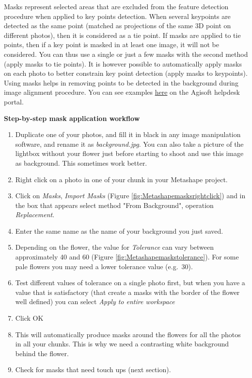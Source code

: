 \documentclass[
]{book}
\begin{document}
Masks represent selected areas that are excluded from the feature
detection procedure when applied to key points detection. When several
keypoints are detected as the same point (matched as projections of the
same 3D point on different photos), then it is considered as a tie
point. If masks are applied to tie points, then if a key point is masked
in at least one image, it will not be considered. You can thus use a
single or just a few masks with the second method (apply masks to tie
points). It is however possible to automatically apply masks on each
photo to better constrain key point detection (apply masks to
keypoints). Using masks helps in removing points to be detected in the
background during image alignment procedure. You can see examples
\href{https://agisoft.freshdesk.com/support/solutions/articles/31000158967-aligning-turntable-photos-with-background-suppression-from-single-mask-in-agisoft-metashape}{here}
on the Agisoft helpdesk portal.

\textbf{Step-by-step mask application workflow}

\begin{enumerate}
\def\labelenumi{\arabic{enumi}.}
\item
  Duplicate one of your photos, and fill it in black in any image
  manipulation software, and rename it as \emph{background.jpg}. You can
  also take a picture of the lightbox without your flower just before
  starting to shoot and use this image as background. This sometimes
  work better.
\item
  Right click on a photo in one of your chunk in your Metashape
  project.
\item
  Click on \emph{Masks}, \emph{Import Masks} (Figure \ref{fig:Metashapemasksrightclick}) and in the box that appears select method "From Background", operation \emph{Replacement}.
\item
  Enter the same name as the name of your background you just saved.
\item
  Depending on the flower, the value for \emph{Tolerance} can vary between
  approximately 40 and 60 (Figure \ref{fig:Metashapemaskstolerance}). For some pale flowers you may need a lower tolerance value (e.g.~30).
\item
  Test different values of tolerance on a single photo first, but when
  you have a value that is satisfactory (that create a masks with the
  border of the flower well defined) you can select \emph{Apply to entire
  workspace}
\item
  Click OK
\item
  This will automatically produce masks around the flowers for all the
  photos in all your chunks. This is why we need a contrasting white
  background behind the flower.
\item
  Check for masks that need touch ups (next section).
\end{enumerate}
\end{document}

